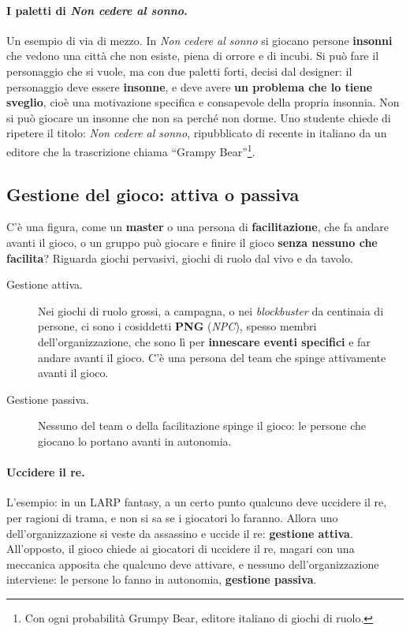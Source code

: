 \paragraph{I paletti di \emph{Non cedere al sonno}.} Un esempio di via di mezzo.
In \emph{Non cedere al sonno} si giocano persone \textbf{insonni} che vedono una
città che non esiste, piena di orrore e di incubi. Si può fare il personaggio che
si vuole, ma con due paletti forti, decisi dal designer: il personaggio deve
essere \textbf{insonne}, e deve avere \textbf{un problema che lo tiene sveglio},
cioè una motivazione specifica e consapevole della propria insonnia. Non si può
giocare un insonne che non sa perché non dorme. Uno studente chiede di ripetere
il titolo: \emph{Non cedere al sonno}, ripubblicato di recente in italiano da un
editore che la trascrizione chiama ``Grampy Bear''\footnote{Con ogni probabilità
Grumpy Bear, editore italiano di giochi di ruolo.}.

\subsection{Gestione del gioco: attiva o passiva}

C'è una figura, come un \textbf{master} o una persona di \textbf{facilitazione},
che fa andare avanti il gioco, o un gruppo può giocare e finire il gioco
\textbf{senza nessuno che facilita}? Riguarda giochi pervasivi, giochi di ruolo
dal vivo e da tavolo.
\begin{description}
  \item[Gestione attiva.] Nei giochi di ruolo grossi, a campagna, o nei
        \emph{blockbuster} da centinaia di persone, ci sono i cosiddetti
        \textbf{PNG} (\emph{NPC}), spesso membri dell'organizzazione, che sono lì
        per \textbf{innescare eventi specifici} e far andare avanti il gioco. C'è
        una persona del team che spinge attivamente avanti il gioco.
  \item[Gestione passiva.] Nessuno del team o della facilitazione spinge il
        gioco: le persone che giocano lo portano avanti in autonomia.
\end{description}

\paragraph{Uccidere il re.} L'esempio: in un LARP fantasy, a un certo punto
qualcuno deve uccidere il re, per ragioni di trama, e non si sa se i giocatori
lo faranno. Allora uno dell'organizzazione si veste da assassino e uccide il re:
\textbf{gestione attiva}. All'opposto, il gioco chiede ai giocatori di uccidere
il re, magari con una meccanica apposita che qualcuno deve attivare, e nessuno
dell'organizzazione interviene: le persone lo fanno in autonomia,
\textbf{gestione passiva}.


